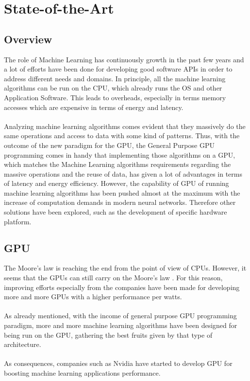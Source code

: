 \chapter{State-of-the-Art}
\section{Overview}
The role of Machine Learning has continuously growth in the past few years and a lot of efforts have been done for developing good software APIs in order to address different needs and domains. \newline In principle, all the machine learning algorithms can be run on the CPU, which already runs the OS and other Application Software. This leads to overheads, especially in terms memory accesses which are expensive in terms of energy and latency. \\\\
Analyzing machine learning algorithms comes evident that they massively do the same operations and access to data with some kind of patterns. Thus, with the outcome of the new paradigm for the GPU, the General Purpose GPU programming comes in handy that implementing those algorithms on a GPU, which matches the Machine Learning algorithms requirements regarding the massive operations and the reuse of data, has given a lot of advantages in terms of latency and energy efficiency. However, the capability of GPU of running machine learning algorithms has been pushed almost at the maximum with the increase of computation demands in modern neural networks. Therefore other solutions have been explored, such as the development of specific hardware platform.

\section{GPU}
The Moore's law is reaching the end from the point of view of CPUs. However, it seems that the GPUs can still carry on the Moore's law \cite{5496638}.\newline
For this reason, improving efforts especially from the companies have been made for developing more and more GPUs with a higher performance per watts.\\\\
As already mentioned, with the income of general purpose GPU programming paradigm, more and more machine learning algorithms have been designed for being run on the GPU, gathering the best fruits given by that type of architecture.\\\\
As consequences, companies such as Nvidia have started to develop GPU for boosting machine learning applications performance.
